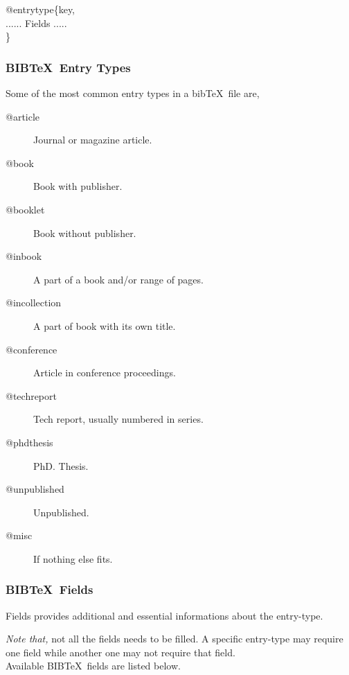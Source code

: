\documentclass[12pt, twocolumn]{article}
\begin{document}
 @entrytype\{key, \\
 \hspace*{6mm} ...... Fields ..... \\ \hspace*{12mm} \}
 
 \subsubsection{BIB\TeX\ Entry Types}
 Some of the most common entry types in a bib\TeX\ file are,
 \begin{description}
  \item [@article] Journal or magazine article.
  \item [@book] Book with publisher.
  \item [@booklet] Book without publisher.
  \item [@inbook] A part of a book and/or range of pages.
  \item [@incollection] A part of book with its own title.
  \item [@conference] Article in conference proceedings.
  \item [@techreport] Tech report, usually numbered in series.
  \item [@phdthesis] PhD. Thesis.
  \item [@unpublished] Unpublished.
  \item [@misc] If nothing else fits.
 \end{description}

 \subsubsection{BIB\TeX\ Fields}
 Fields provides additional and essential informations about the entry-type.
 
 \emph{Note that,} not all the fields needs to be filled. A specific entry-type may require one field while another one may not require that field.\\
 
 \noindent Available BIB\TeX\ fields are listed below.
 
\end{document}
